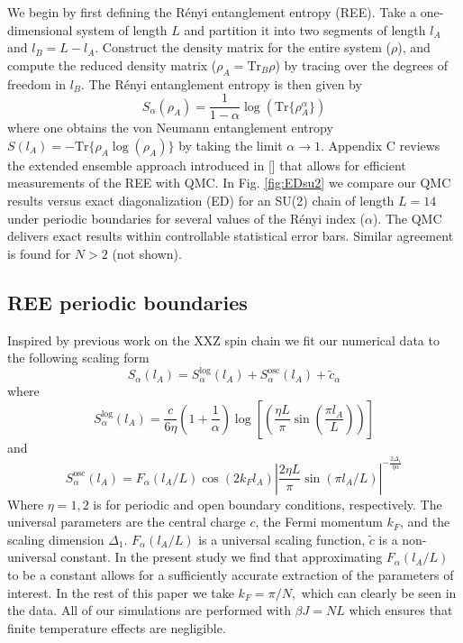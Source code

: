 \documentclass[aps,prb,reprint,floatfix]{revtex4-1}
\begin{document}
We begin by first defining the R\'{e}nyi entanglement entropy (REE).  Take a one-dimensional system of length $L$ and partition it into two segments of length $l_{A}$ and $l_{B}=L-l_{A}$.  Construct the density matrix for the entire system ($\rho$), and compute the reduced density matrix ($\rho_{A}=\mathrm{Tr}_{B}\rho$) by tracing over the degrees of freedom in $l_{B}$.  The R\'{e}nyi entanglement entropy is then given by
\begin{equation}
		S_{\alpha}(\rho_{A})= \frac{1}{1-\alpha}\log(\text{Tr}\{ \rho^{\alpha}_{A} \})
\label{eq:REE}
\end{equation}
where one obtains the von Neumann entanglement entropy $S(l_{A})=-\textrm{Tr}\{\rho_{A}\log(\rho_{A})\}$ by taking the limit $\alpha\to1$.  Appendix C reviews the extended ensemble approach introduced in [] that allows for efficient measurements of the REE with QMC.  In Fig. \ref{fig:EDsu2} we compare our QMC results versus exact diagonalization (ED) for an SU(2) chain of length $L=14$ under periodic boundaries for several values of the R\'{e}nyi index ($\alpha$).    The QMC delivers exact results within controllable statistical error bars.  Similar agreement is found for $N>2$ (not shown).

\subsection{REE periodic boundaries} 
\label{subsec:REEclosedBC}

Inspired by previous work on the XXZ spin chain we fit our numerical data to the following scaling form\cite{Calabrese2010:ParityEffects}
{\allowdisplaybreaks
\begin{equation}
		S_{\alpha}(l_{A}) =S^{\mathrm{log}}_{\alpha}(l_{A})+S^{\mathrm{osc}}_{\alpha}(l_{A})+\tilde{c}_\alpha
\label{eq:GenScalingForm}
\end{equation}}
where
{\allowdisplaybreaks
\begin{equation}
		S^{\mathrm{log}}_{\alpha}(l_{A}) =\frac{c}{6 \eta}\left(1+\frac{1}{\alpha}\right)\log\left[\left(\frac{\eta L}{\pi}\sin\left(\frac{\pi l_{A}}{L}\right)\right)\right]
\label{eq:Slog}
\end{equation}}
and 
{\allowdisplaybreaks
\begin{equation}
		S^{\mathrm{osc}}_{\alpha}(l_{A}) =F_{\alpha}(l_{A}/L)\cos(2k_Fl_{A})\left|\frac{2\eta L}{\pi}\sin(\pi l_{A}/L)\right|^{-\frac{2\Delta_{1}}{\eta \alpha}}
\label{eq:Sosc}
\end{equation}}
Where $\eta=1,2$ is for periodic and open boundary conditions, respectively.  The universal parameters are the central charge $c$, the Fermi momentum $k_{F}$, and the scaling dimension $\Delta_{1}$.  $F_{\alpha}(l_{A}/L)$ is a universal scaling function, $\tilde{c}$ is a non-universal constant.  In the present study we find that approximating $F_{\alpha}(l_{A}/L)$ to be a constant allows for a sufficiently accurate extraction of the parameters of interest.  In the rest of this paper we take $k_{F}=\pi/N,$ which can clearly be seen in the data.  All of our simulations are performed with $\beta J=N L$ which ensures that finite temperature effects are negligible.
\end{document}
